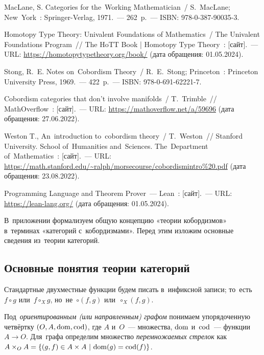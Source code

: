 \documentclass[a4paper,oneside]{article}
\begin{document}
\begin{thebibliography}{}
 MacLane, S. Categories for the~Working Mathematician~/ S.~MacLane; New~York~: Springer-Verlag, 1971.~— 262~p.~— ISBN: 978-0-387-90035-3.

 Homotopy Type Theory: Univalent Foundations of Mathematics~/ The {Uni\-va\-lent} Foundations Program~//
The HoTT Book | Homotopy Type {The\-o\-ry}~: [сайт].~— URL: \url{https://homotopytypetheory.org/book/} (дата обращения: 01.05.2024).

 Stong, R.~E. Notes on~Cobordism Theory~/ R.~E.~Stong; Princeton~: Princeton University Press, 1969.~— 422~p.~— ISBN: 978-0-691-62221-7.

 Cobordism categories that don’t involve manifolds~/ T.~Trimble~//
{Math\-Over\-flow}~: [сайт].~— URL: \url{https://mathoverflow.net/a/59696} (дата обращения: 27.06.2022).

 Weston T., An~introduction to~cobordism theory~/ T.~Weston~//
{Stan\-ford} University. School of~Humanities and~Sciences.
The~Department of~{Math\-e\-mat\-ics}~: [сайт].~— URL: \url{https://math.stanford.edu/~ralph/morsecourse/cobordismintro%20.pdf} (дата обращения: 23.08.2022).

 Programming Language and Theorem Prover~— Lean~: [сайт].~— URL: \url{https://lean-lang.org/} (дата обращения: 01.05.2024).
\end{thebibliography}

\label{TheEnd}
\pagebreak

\renewcommand*{\theHsection}{appendix.\arabic{section}}

\renewcommand{\thesection}{\Alph{section}}
\setcounter{section}{1}
\setcounter{subsection}{0}

В~приложении формализуем общую концепцию «теории кобордизмов» в~терминах «категорий с~кобордизмами».
Перед этим изложим основные сведения из~теории категорий.

\subsection{Основные понятия теории категорий}
Стандартные двухместные функции будем писать в~инфиксной записи; то~есть $f \circ g$ или~$f \circ_X g$, но~не~$\circ(f, g)$ или~$\circ_X(f, g)$.

Под~\textit{ориентированным (или направленным) графом} \cite{MacLane71} понимаем упорядоченную четвёртку $(O,\allowbreak A,\allowbreak \mathrm{dom},\allowbreak \mathrm{cod})$,
где $A$ и~$O$~— множества, $\mathrm{dom}$ и~$\mathrm{cod}$~— функции $A \rightarrow O$.
Для~графа определим множество \textit{перемножаемых стрелок} как $A \times_O A = \{ (g, f) \in A \times A \ |\ \dom(g) = \cod(f) \}$.
\end{document}
